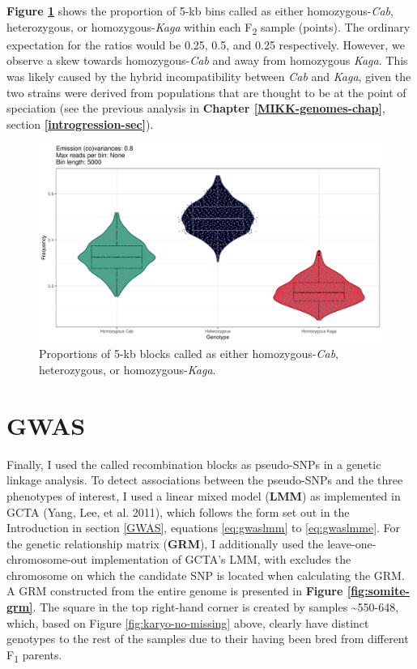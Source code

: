 \documentclass[
]{book}
\begin{document}
\textbf{Figure \ref{fig:prop-sites-total}} shows the proportion of 5-kb bins called as either homozygous-\emph{Cab}, heterozygous, or homozygous-\emph{Kaga} within each F\textsubscript{2} sample (points). The ordinary expectation for the ratios would be 0.25, 0.5, and 0.25 respectively. However, we observe a skew towards homozygous-\emph{Cab} and away from homozygous \emph{Kaga}. This was likely caused by the hybrid incompatibility between \emph{Cab} and \emph{Kaga}, given the two strains were derived from populations that are thought to be at the point of speciation (see the previous analysis in \textbf{Chapter \ref{MIKK-genomes-chap}}, section \textbf{\ref{introgression-sec}}).



\begin{figure}
\includegraphics[width=1\linewidth]{figs/somites/prop_sites_total} \caption{Proportions of 5-kb blocks called as either homozygous-\emph{Cab}, heterozygous, or homozygous-\emph{Kaga}.}\label{fig:prop-sites-total}
\end{figure}

\clearpage

\hypertarget{somite-assoc-tests}{%
\section{GWAS}\label{somite-assoc-tests}}

Finally, I used the called recombination blocks as pseudo-SNPs in a genetic linkage analysis. To detect associations between the pseudo-SNPs and the three phenotypes of interest, I used a linear mixed model (\textbf{LMM}) as implemented in GCTA (Yang, Lee, et al. 2011), which follows the form set out in the Introduction in section \ref{GWAS}, equations \eqref{eq:gwaslmm} to \eqref{eq:gwaslmme}. For the genetic relationship matrix (\textbf{GRM}), I additionally used the leave-one-chromosome-out implementation of GCTA's LMM, with excludes the chromosome on which the candidate SNP is located when calculating the GRM. A GRM constructed from the entire genome is presented in \textbf{Figure \ref{fig:somite-grm}}. The square in the top right-hand corner is created by samples \textasciitilde550-648, which, based on Figure \ref{fig:karyo-no-missing} above, clearly have distinct genotypes to the rest of the samples due to their having been bred from different F\textsubscript{1} parents.
\end{document}

